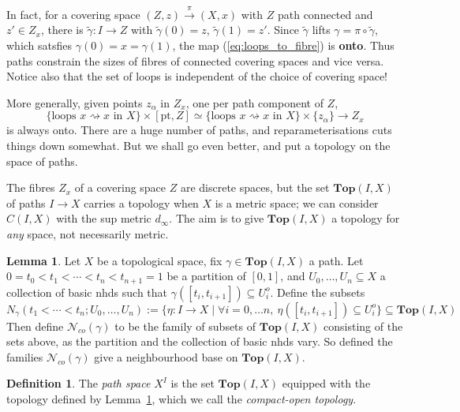 \documentclass{tufte-handout}
\def\cN {\mathcal{N}}
\def\pt {\mathrm{pt}}
\def\Top {\mathbf{Top}}
\theoremstyle{definition}
\newtheorem{lemma}{Lemma}
\newtheorem{definition}{Definition}
\begin{document}
In fact, for a covering space $(Z,z)\xrightarrow{\pi} (X,x)$ with $Z$ path connected 
and $z'\in Z_x$, there is $\widetilde{\gamma}\colon I\to Z$ with $\widetilde{\gamma}(0)=z$, 
$\widetilde{\gamma}(1)=z'$. Since $\widetilde{\gamma}$ lifts $\gamma = \pi\circ \widetilde{\gamma}$, 
which satsfies $\gamma(0) = x = \gamma(1)$, the map (\ref{eq:loops_to_fibre}) is \textbf{onto}.
Thus paths constrain the sizes of fibres of connected covering spaces and vice versa. 
Notice also that the set of loops is independent of the choice of covering space!

More generally, given points $z_\alpha$ in $Z_x$,\marginnote{that is: a section of $Z\to [\pt,Z]$} one per path component of $Z$,
\[
\{\text{loops }x \rightsquigarrow x\text{ in }X\}\times [\pt,Z] \simeq \{\text{loops }x \rightsquigarrow x\text{ in }X\}\times\{z_\alpha\} \to Z_x
\]
is always onto. There are a huge number of paths, and reparameterisations cuts things down somewhat. 
But we shall go even better, and put a topology on the space of paths.


The fibres $Z_x$ of a covering space $Z$ are discrete spaces, but the set 
$\Top(I,X)$ of paths $I\to X$ carries a topology when $X$ is a metric space; we can 
consider $C(I,X)$ with the sup metric $d_\infty$. The aim is to give $\Top(I,X)$ a 
topology for \emph{any} space, not necessarily metric.

\begin{lemma}\label{lemma:compact_open_base}
Let $X$ be a topological space, fix $\gamma\in \Top(I,X)$ a path. Let 
$0=t_0 < t_1 < \cdots < t_n < t_{n+1} = 1$ be a partition of $[0,1]$, and $U_0, \ldots, U_n \subseteq X$ 
a collection of basic nhds such that $\gamma([t_i,t_{i+1}]) \subseteq U_i^o$.
Define the subsets
\[
	N_\gamma(t_1<\cdots<t_n;U_0,\ldots,U_n) :=\{\eta\colon I\to X\mid\forall i=0,\ldots n,\ 
		\eta([t_i,t_{i+1}]) \subseteq U_i^o\} \subseteq \Top(I,X)
\]
Then define $\cN_{co}(\gamma)$ to be the family of subsets of $\Top(I,X)$ consisting of the sets above, as the partition and the collection of basic nhds vary. So defined the families $\cN_{co}(\gamma)$ give a neighbourhood base on $\Top(I,X)$.
\end{lemma}

\begin{definition}
The \emph{path space} $X^I$ is the set $\Top(I,X)$ equipped with the topology defined by
Lemma~\ref{lemma:compact_open_base}, which we call the \emph{compact-open topology}.
\end{definition}
\end{document}
